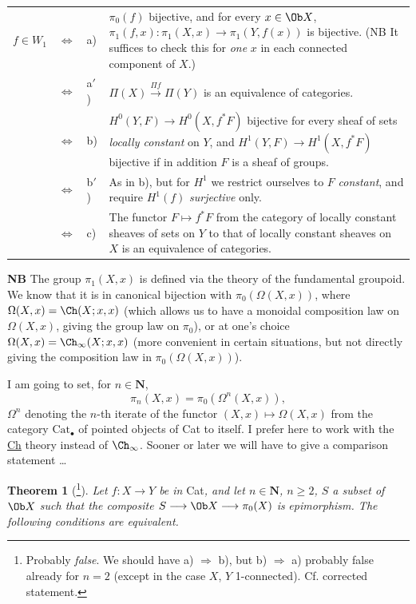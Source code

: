 \noindent\begin{tabular}{@{}l c l >{\RaggedRight\arraybackslash}p{}@{}}
$f \in W_1$ & $\Longleftrightarrow$ & a) & $\pi_0(f)$ bijective, and for every $x \in \Ob X$, $\pi_1(f,x) : \pi_1(X,x) \longrightarrow \pi_1(Y,f(x))$ is bijective. (NB It suffices to check this for \textit{one} $x$ in each connected component of $X$.)\\
 & $\Longleftrightarrow$ & a$'$) & $\Pi(X) \xrightarrow{\Pi f} \Pi(Y)$ is an equivalence of categories.\\
 & $\Longleftrightarrow$ & b) & $H^0(Y,F) \longrightarrow H^0(X,f^*F)$ bijective for every sheaf of sets \textit{locally constant} on $Y$, and $H^1(Y,F) \longrightarrow H^1(X,f^*F)$ bijective if in addition $F$ is a sheaf of groups.\\
 & $\Longleftrightarrow$ & b$'$) & As in b), but for $H^1$ we restrict ourselves to $F$ \textit{constant}, and require $H^1(f)$ \textit{surjective} only.\\
 & $\Longleftrightarrow$ & c) & The functor $F \longmapsto f^*F$ from the category of locally constant sheaves of sets on $Y$ to that of locally constant sheaves on $X$ is an equivalence of categories.
\end{tabular}

\clearpage



\textbf{NB} The group $\pi_1(X,x)$ is defined via the theory of the fundamental groupoid. We know that it is in canonical bijection with $\pi_0(\Omega(X,x))$, where $\Omega(X,x) = \Ch(X;x,x)$ (which allows us to have a monoidal composition law on $\Omega(X,x)$, giving the group law on $\pi_0$), or at one's choice $\Omega(X,x) = \Ch_\infty(X;x,x)$ (more convenient in certain situations, but not directly giving the composition law in $\pi_0(\Omega(X,x))$).

I am going to set, for $n \in \mathbf{N}$,
\[
\pi_n(X,x) = \pi_0(\Omega^n(X,x)),
\]
$\Omega^n$ denoting the $n$-th iterate of the functor $(X,x) \longmapsto \Omega(X,x)$ from the category $\mathrm{Cat}_\bullet$ of pointed objects of Cat to itself. I prefer here to work with the \underline{Ch} theory instead of $\Ch_\infty$. Sooner or later we will have to give a comparison statement \dots

\textbf{Theorem 1} (\footnote[112]{Probably \textit{false}. We should have a) $\Longrightarrow$ b), but b) $\Longrightarrow$ a) probably false already for $n = 2$ (except in the case $X$, $Y$ 1-connected). Cf. corrected statement.}). \textit{Let $f : X \longrightarrow Y$ be in} Cat\textit{, and let $n \in \mathbf{N}$, $n \geq 2$, $S$ a subset of} $\Ob X$ \textit{such that the composite $S \longrightarrow \Ob X \longrightarrow \pi_0(X)$ is} \textit{epimorphism. The following conditions are equivalent.}

